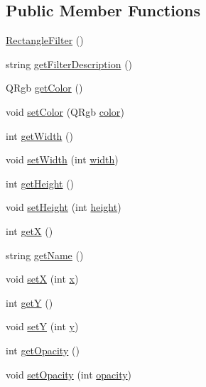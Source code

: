 \subsection*{Public Member Functions}
\begin{DoxyCompactItemize}
\item 
\hyperlink{classModel_1_1RectangleFilter_a74b7006780424b64c299443d1b54fc03}{Rectangle\+Filter} ()
\item 
string \hyperlink{classModel_1_1RectangleFilter_a62b7b60e24f92234393b840b35808e06}{get\+Filter\+Description} ()
\item 
Q\+Rgb \hyperlink{classModel_1_1RectangleFilter_ae697defefbdf5f895406269b15758d91}{get\+Color} ()
\item 
void \hyperlink{classModel_1_1RectangleFilter_ad858846447f303e473dc8004ef607666}{set\+Color} (Q\+Rgb \hyperlink{classModel_1_1RectangleFilter_a6e0c08bd2043c82b2e837117d811db91}{color})
\item 
int \hyperlink{classModel_1_1RectangleFilter_a67a0997183f24da19b776d96c1052998}{get\+Width} ()
\item 
void \hyperlink{classModel_1_1RectangleFilter_a8b4c8bccc530aa0a9b0139e04913af32}{set\+Width} (int \hyperlink{classModel_1_1RectangleFilter_a2474a5474cbff19523a51eb1de01cda4}{width})
\item 
int \hyperlink{classModel_1_1RectangleFilter_a07efb2a4e9a982688c8bb3c3f21d1092}{get\+Height} ()
\item 
void \hyperlink{classModel_1_1RectangleFilter_a7013185ad2825ade83994b396c4fdfcd}{set\+Height} (int \hyperlink{classModel_1_1RectangleFilter_ad12fc34ce789bce6c8a05d8a17138534}{height})
\item 
int \hyperlink{classModel_1_1RectangleFilter_ae13f88e922e1339355456062ad9fa359}{get\+X} ()
\item 
string \hyperlink{classModel_1_1RectangleFilter_a11335e13e50af74108bf926dc1340b4b}{get\+Name} ()
\item 
void \hyperlink{classModel_1_1RectangleFilter_add2578ea6b65ad27a905a6d2048748bb}{set\+X} (int \hyperlink{classModel_1_1RectangleFilter_a6150e0515f7202e2fb518f7206ed97dc}{x})
\item 
int \hyperlink{classModel_1_1RectangleFilter_aab81944f0a14bba932c0931899951937}{get\+Y} ()
\item 
void \hyperlink{classModel_1_1RectangleFilter_adea78a9ff1234e75627dda61d972213b}{set\+Y} (int \hyperlink{classModel_1_1RectangleFilter_a0a2f84ed7838f07779ae24c5a9086d33}{y})
\item 
int \hyperlink{classModel_1_1RectangleFilter_a0c8618c617e65d5ab8400704bbc09ed1}{get\+Opacity} ()
\item 
void \hyperlink{classModel_1_1RectangleFilter_a22b140225648b55b27f2330938ae4006}{set\+Opacity} (int \hyperlink{classModel_1_1RectangleFilter_ab86f8ec3f0949a133a694bba7f166a05}{opacity})
\end{DoxyCompactItemize}
